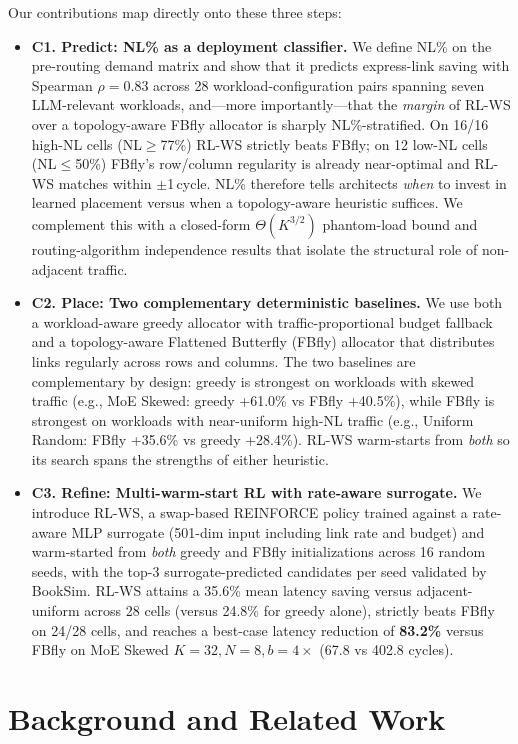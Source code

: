 \documentclass[conference]{IEEEtran}
\begin{document}
Our contributions map directly onto these three steps:
\begin{itemize}
\item \textbf{C1. Predict: NL\% as a deployment classifier.} We define NL\% on the pre-routing demand matrix and show that it predicts express-link saving with Spearman $\rho=0.83$ across 28 workload-configuration pairs spanning seven LLM-relevant workloads, and---more importantly---that the \textit{margin} of RL-WS over a topology-aware FBfly allocator is sharply NL\%-stratified. On 16/16 high-NL cells (NL$\ge$77\%) RL-WS strictly beats FBfly; on 12 low-NL cells (NL$\le$50\%) FBfly's row/column regularity is already near-optimal and RL-WS matches within $\pm$1\,cycle. NL\% therefore tells architects \textit{when} to invest in learned placement versus when a topology-aware heuristic suffices. We complement this with a closed-form $\Theta(K^{3/2})$ phantom-load bound and routing-algorithm independence results that isolate the structural role of non-adjacent traffic.
\item \textbf{C2. Place: Two complementary deterministic baselines.} We use both a workload-aware greedy allocator with traffic-proportional budget fallback and a topology-aware Flattened Butterfly (FBfly) allocator that distributes links regularly across rows and columns. The two baselines are complementary by design: greedy is strongest on workloads with skewed traffic (e.g., MoE Skewed: greedy +61.0\% vs FBfly +40.5\%), while FBfly is strongest on workloads with near-uniform high-NL traffic (e.g., Uniform Random: FBfly +35.6\% vs greedy +28.4\%). RL-WS warm-starts from \textit{both} so its search spans the strengths of either heuristic.
\item \textbf{C3. Refine: Multi-warm-start RL with rate-aware surrogate.} We introduce RL-WS, a swap-based REINFORCE policy trained against a rate-aware MLP surrogate (501-dim input including link rate and budget) and warm-started from \textit{both} greedy and FBfly initializations across 16 random seeds, with the top-3 surrogate-predicted candidates per seed validated by BookSim. RL-WS attains a 35.6\% mean latency saving versus adjacent-uniform across 28 cells (versus 24.8\% for greedy alone), strictly beats FBfly on 24/28 cells, and reaches a best-case latency reduction of \textbf{83.2\%} versus FBfly on MoE Skewed $K{=}32, N{=}8, b{=}4\times$ (67.8 vs 402.8 cycles).
\end{itemize}

\section{Background and Related Work}
\label{sec:related}
\end{document}

